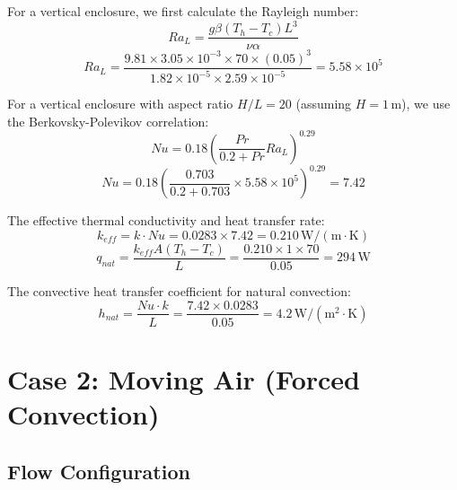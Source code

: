 \documentclass[11pt]{article}
\newcommand{\unit}[1]{\,\mathrm{#1}}
\begin{document}
For a vertical enclosure, we first calculate the Rayleigh number:
\begin{equation}
    Ra_L = \frac{g\beta(T_h - T_c)L^3}{\nu\alpha}
\end{equation}
\begin{equation}
    Ra_L = \frac{9.81 \times 3.05 \times 10^{-3} \times 70 \times (0.05)^3}{1.82 \times 10^{-5} \times 2.59 \times 10^{-5}} = \boxed{5.58 \times 10^5}
\end{equation}

For a vertical enclosure with aspect ratio $H/L = 20$ (assuming $H = 1\unit{m}$), we use the Berkovsky-Polevikov correlation:
\begin{equation}
    Nu = 0.18 \left(\frac{Pr}{0.2 + Pr} Ra_L\right)^{0.29}
\end{equation}
\begin{equation}
    Nu = 0.18 \left(\frac{0.703}{0.2 + 0.703} \times 5.58 \times 10^5\right)^{0.29} = \boxed{7.42}
\end{equation}

The effective thermal conductivity and heat transfer rate:
\begin{equation}
    k_{eff} = k \cdot Nu = 0.0283 \times 7.42 = 0.210\unit{W/(m \cdot K)}
\end{equation}
\begin{equation}
    q_{nat} = \frac{k_{eff} A (T_h - T_c)}{L} = \frac{0.210 \times 1 \times 70}{0.05} = \boxed{294\unit{W}}
\end{equation}

The convective heat transfer coefficient for natural convection:
\begin{equation}
    h_{nat} = \frac{Nu \cdot k}{L} = \frac{7.42 \times 0.0283}{0.05} = \boxed{4.2\unit{W/(m^2 \cdot K)}}
\end{equation}

\section{Case 2: Moving Air (Forced Convection)}

\subsection{Flow Configuration}
\end{document}
